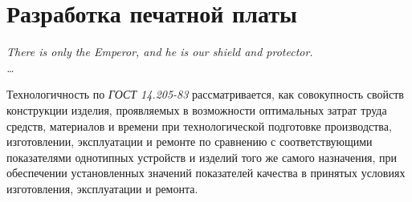 \documentclass{article}
\begin{document}
\tableofcontents
\newpage
\section{Разработка печатной платы}
\begin{flushright}
    \itshape
    There is only the Emperor, and he is our shield and protector.\\
    \ldots
\end{flushright}
Технологичность по \textit{ГОСТ 14.205-83} рассматривается, как совокупность
свойств конструкции изделия, проявляемых в возможности оптимальных затрат труда
средств, материалов и времени при технологической подготовке производства,
изготовлении, эксплуатации и ремонте по сравнению с соответствующими
показателями однотипных устройств и изделий того же самого назначения, при
обеспечении установленных значений показателей качества в принятых условиях
изготовления, эксплуатации и ремонта.


%

\newpage
\section[Список использованной литературы]{}
\begin{thebibliography}{30}
    
\end{thebibliography}
\end{document}
